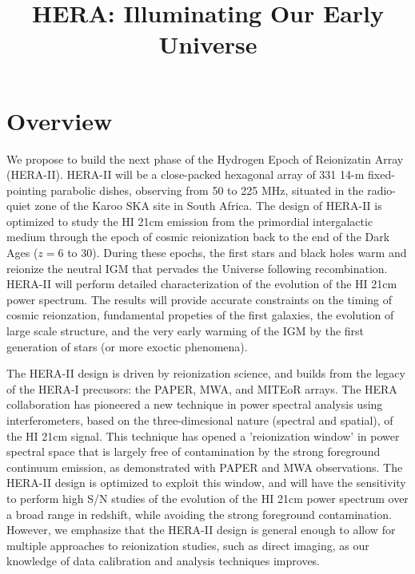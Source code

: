\documentclass[preprint]{aastex}
\begin{document}
\pagestyle{empty}

\title{HERA: Illuminating Our Early Universe}

\section*{Overview}

We propose to build the next phase of the Hydrogen Epoch of Reionizatin Array (HERA-II). HERA-II will
be a close-packed hexagonal array of 331 14-m fixed-pointing parabolic dishes, observing from 50 to 225 MHz,
situated in the radio-quiet zone of the Karoo SKA site in South Africa.
The design of HERA-II is optimized to study the HI 21cm emission from the primordial intergalactic medium through the epoch
of cosmic reionization back to the end of the Dark Ages ($z = 6$ to 30). During these epochs, the first stars and 
black holes warm and reionize the neutral IGM that pervades the Universe following recombination. 
HERA-II will perform detailed characterization of the evolution of the HI 21cm power spectrum. 
The results will provide accurate constraints on the timing of cosmic reionzation, 
fundamental propeties of the first galaxies, the evolution
of large scale structure, and the very early warming of the IGM by the first generation of stars (or more exoctic
phenomena). 

The HERA-II design is driven by reionization science, and builds from the legacy of the HERA-I precusors:
the PAPER, MWA, and MITEoR arrays. The HERA collaboration has pioneered a new technique in power spectral
analysis using interferometers, based on the three-dimesional nature (spectral and spatial), of the
HI 21cm signal. This technique has opened a 'reionization window' in power spectral space that is 
largely free of contamination by the strong foreground continuum emission, as demonstrated with PAPER
and MWA observations. The HERA-II design is optimized to 
exploit this window, and will have the sensitivity to perform high S/N studies of the evolution of 
the HI 21cm power spectrum over a broad range in redshift, while avoiding the strong foreground 
contamination.  However, we emphasize that the HERA-II design is general enough to allow for multiple 
approaches to reionization studies, such as direct imaging, as our knowledge of data calibration and
analysis techniques improves. 
\end{document}
